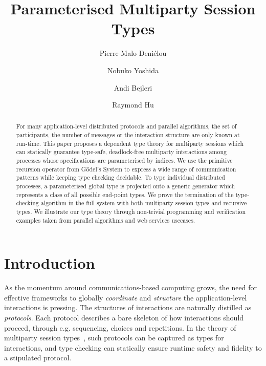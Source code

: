 \documentclass{LMCS}
\title[Parameterised Multiparty Session Types]{Parameterised Multiparty Session Types}
\author[P.-M.~Deni\'elou]{Pierre-Malo Deni\'elou}
\author[N.~Yoshida]{Nobuko Yoshida}
\author[A.~Bejleri]{Andi Bejleri}
\author[R.~Hu]{Raymond Hu}
\begin{document}
\begin{abstract}
\noindent
For many application-level distributed protocols and parallel algorithms, the
set of participants, the number of messages or the interaction structure are
only known at run-time.
This paper proposes a dependent type theory for multiparty sessions which can
statically guarantee type-safe, deadlock-free multiparty interactions among
processes whose specifications are parameterised by indices.
We use the primitive recursion operator from G\"odel's System  to
express a wide range of communication patterns while keeping type checking
decidable.
To type individual distributed processes, a parameterised global type is
projected onto a generic generator which represents a class of all possible
end-point types.
We prove the termination of the type-checking algorithm in the
full system with both multiparty session types and recursive types.
We illustrate our type theory through non-trivial
programming and verification examples
taken from parallel algorithms and web services usecases.
\end{abstract}




















\maketitle

\section{Introduction}
\label{sec:introduction}
\noindent
As the momentum around communications-based computing grows, the need
for effective frameworks to
globally {\em coordinate} and {\em structure} the application-level
interactions is pressing. The structures of interactions are naturally distilled as
{\em protocols}. Each protocol describes a bare skeleton of how
interactions should proceed, through e.g.
sequencing, choices and repetitions.
In the theory of multiparty session types~\cite{CHY07,BC07,BettiniCDLDY08LONG},
such protocols can be captured as types for interactions,
and type checking can statically ensure runtime safety and fidelity
to a stipulated
protocol.
\end{document}

